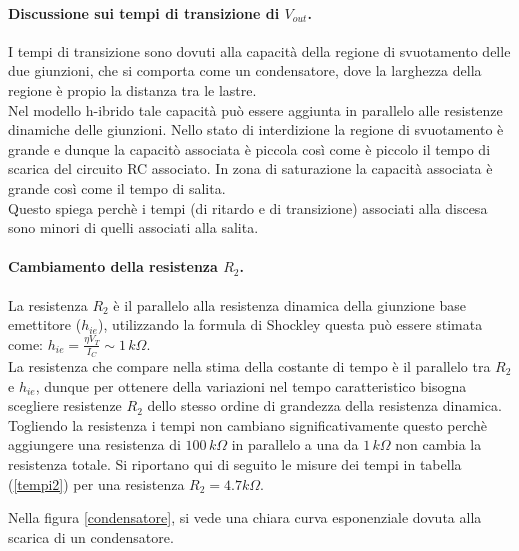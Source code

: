 \documentclass[10pt,a4paper]{article}
\begin{document}
\paragraph{Discussione sui tempi di transizione di $ V_{out}$.}
I tempi di transizione sono dovuti alla capacità della regione di svuotamento delle due giunzioni, che si comporta come un condensatore, dove la larghezza della regione è propio la distanza tra le lastre. \\
Nel modello h-ibrido tale capacità può essere aggiunta in parallelo alle resistenze dinamiche delle giunzioni. Nello stato di interdizione la regione di svuotamento è grande e dunque la capacitò associata è piccola così come è piccolo il tempo di scarica del circuito RC associato. In zona di saturazione la capacità associata è grande così come il tempo di salita. 
\\Questo spiega perchè i tempi (di ritardo e di transizione) associati alla discesa sono minori di quelli associati alla salita.

\paragraph{Cambiamento della resistenza $R_2$.}
La resistenza $R_2$ è il parallelo alla resistenza dinamica della giunzione base emettitore ($h_{ie}$), utilizzando la formula di Shockley questa può essere stimata come: $h_{ie} = \frac{\eta V_T}{I_C} \sim 1 \, k \Omega$. \\
La resistenza che compare nella stima della costante di tempo è il parallelo tra $R_2$ e $h_{ie}$, dunque per ottenere della variazioni nel tempo caratteristico bisogna scegliere resistenze $R_2$ dello stesso ordine di grandezza della resistenza dinamica.\\
Togliendo la resistenza i tempi non cambiano significativamente questo perchè aggiungere una resistenza di $100 \, k\Omega$ in parallelo a una da $1 \, k\Omega$ non cambia la resistenza totale. Si riportano qui di seguito le misure dei tempi in tabella (\ref{tempi2}) per una resistenza $R_2 = 4.7 k\Omega$.

Nella figura \ref{condensatore}, si vede una chiara curva esponenziale dovuta alla scarica di un condensatore.\\
\end{document}
